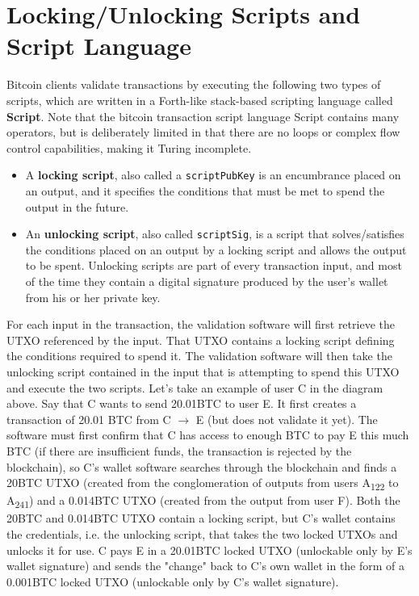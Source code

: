 \documentclass{article}
\begin{document}
\section{Locking/Unlocking Scripts and Script Language}

    Bitcoin clients validate transactions by executing the following two types of scripts, which are written in a Forth-like stack-based scripting language called \textbf{Script}. Note that the bitcoin transaction script language Script contains many operators, but is deliberately limited in that there are no loops or complex flow control capabilities, making it Turing incomplete.

    \begin{itemize}
      \item A \textbf{locking script}, also called a \texttt{scriptPubKey} is an encumbrance placed on an output, and it specifies the conditions that must be met to spend the output in the future.
      \item An \textbf{unlocking script}, also called \texttt{scriptSig}, is a script that solves/satisfies the conditions placed on an output by a locking script and allows the output to be spent. Unlocking scripts are part of every transaction input, and most of the time they contain a digital signature produced by the user's wallet from his or her private key.
    \end{itemize}

    For each input in the transaction, the validation software will first retrieve the UTXO referenced by the input. That UTXO contains a locking script defining the conditions required to spend it. The validation software will then take the unlocking script contained in the input that is attempting to spend this UTXO and execute the two scripts. Let's take an example of user C in the diagram above. Say that C wants to send 20.01BTC to user E. It first creates a transaction of 20.01 BTC from C $\rightarrow$ E (but does not validate it yet). The software must first confirm that C has access to enough BTC to pay E this much BTC (if there are insufficient funds, the transaction is rejected by the blockchain), so C's wallet software searches through the blockchain and finds a 20BTC UTXO (created from the conglomeration of outputs from users A\textsubscript{122} to A\textsubscript{241}) and a 0.014BTC UTXO (created from the output from user F). Both the 20BTC and 0.014BTC UTXO contain a locking script, but C's wallet contains the credentials, i.e. the unlocking script, that takes the two locked UTXOs and unlocks it for use. C pays E in a 20.01BTC locked UTXO (unlockable only by E's wallet signature) and sends the "change" back to C's own wallet in the form of a 0.001BTC locked UTXO (unlockable only by C's wallet signature).
\end{document}
